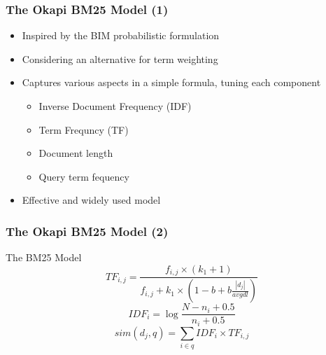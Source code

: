 \documentclass[svgnames]{beamer}
\begin{document}
\begin{frame} \frametitle{The Okapi BM25 Model (1)}
\begin{itemize}
\item Inspired by the BIM probabilistic formulation
\item Considering an alternative for term weighting
\item Captures various aspects in a simple formula, tuning each component
    \begin{itemize}
    \item Inverse Document Frequency (IDF)
    \item Term Frequncy (TF)
    \item Document length 
    \item Query term fequency
    \end{itemize}
\item Effective and widely used model
\end{itemize}
\end{frame}

\begin{frame} \frametitle{The Okapi BM25 Model (2)}
\begin{block}{The BM25 Model}
    \begin{displaymath}
          TF_{i,j} = \frac{f_{i,j} \times (k_1 + 1)}
                                  {f_{i,j} + k_1 \times \left( 1-b+b\frac{|d_j|}{avgdl} \right)}
    \end{displaymath}
    \begin{displaymath}
        IDF_i = \log\frac{N - n_i + 0.5}{n_i + 0.5}
    \end{displaymath}
    \begin{displaymath}
          sim(d_j,q) =
          \sum_{i \in q} IDF_i \times TF_{i,j} 
    \end{displaymath}
\end{block}
\end{frame}

\end{document}
